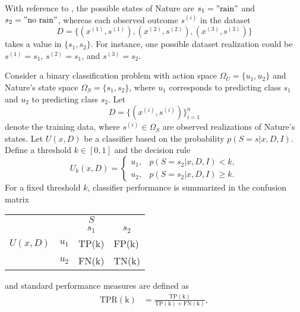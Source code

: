 \begin{example}
	With reference to , the possible states of Nature are $s_1 = "\text{rain}"$ and $s_2 = "\text{no rain}"$, whereas each observed outcome $s^{(i)}$ in the dataset 
	\begin{equation}
		D = \{(x^{(1)},s^{(1)}),(x^{(2)},s^{(2)}),(x^{(3)},s^{(3)})\}
	\end{equation}
	takes a value in $\{s_1,s_2\}$. For instance, one possible dataset realization could be $s^{(1)}=s_1$, $s^{(2)}=s_1$, and $s^{(3)}=s_2$.
\end{example}

\begin{example}
	Consider a binary classification problem with action space $\Omega_U = \{u_1,u_2\}$ and Nature's state space $\Omega_S = \{s_1, s_2\}$, where $u_1$ corresponds to predicting class $s_1$ and $u_2$ to predicting class $s_2$. Let
	\begin{equation}
		D = \{(x^{(i)},s^{(i)})\}_{i=1}^n
	\end{equation}
	denote the training data, where $s^{(i)} \in \Omega_S$ are observed realizations of Nature's states. Let $U(x,D)$ be a classifier based on the probability $p(S = s | x, D, I)$. Define a threshold $k\in[0,1]$ and the decision rule
	\begin{equation}
		U_k(x,D) =
		\begin{cases}
			u_1, & p(S=s_2 | x, D, I) < k,\\
			u_2, & p(S=s_2 | x, D, I) \ge k.
		\end{cases}
	\end{equation}
	For a fixed threshold $k$, classifier performance is summarized in the confusion matrix
	\begin{center}
		\begin{tabular}{ c  c  c c}
			&& $S$ &  \\
			&& $s_1$ & $s_2$ \\
			\cline{3-4}
			$U(x,D)$ & $u_1$& \multicolumn{1}{|l}{TP(k)} & \multicolumn{1}{l|}{FP(k)}\\
			& $u_2$& \multicolumn{1}{|l}{FN(k)} & \multicolumn{1}{l|}{TN(k)}\\
			\cline{3-4}
		\end{tabular}
	\end{center}
	and standard performance measures are defined as
	\begin{align}
		\operatorname{TPR(k)} &= \frac{\operatorname{TP(k)}}{\operatorname{TP(k)} + \operatorname{FN(k)}},\\

\end{align}
\end{example}
